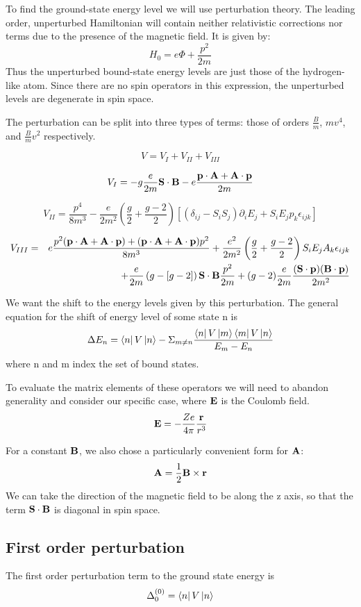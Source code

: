 To find the ground-state energy level we will use perturbation theory.  The leading order, unperturbed Hamiltonian will contain neither relativistic corrections nor terms due to the presence of the magnetic field.  It is given by:
\[ H_0 = e\Phi + \frac{p^2}{2m}  \]
Thus the unperturbed bound-state energy levels are just those of the hydrogen-like atom.  Since there are no spin operators in this expression, the unperturbed levels are degenerate in spin space.

The perturbation can be split into three types of terms: those of orders $\frac{B}{m}$, $mv^4$, and $\frac{B}{m}v^2$ respectively.

\[	V = V_{I} + V_{II} + V_{III}	\]

\[V_{I} = -g \frac{e}{2m} \mathbf{S} \cdot \mathbf{B} - e \frac{\mathbf{p} \cdot \mathbf{A} + \mathbf{A} \cdot \mathbf{p}}{2m} \]

\[V_{II} = \frac{p^4}{8m^3} - \frac{e}{2m^2}\left(\frac{g}{2} + \frac{g-2}{2} \right) \left [ (\delta_{ij} - S_i S_j ) \partial_i E_j + S_i E_j p_k \epsilon_{ijk} \right ]  \] 

\begin{eqnarray*}
 V_{III} &=& 
		e\frac{p^2 ( \mathbf{p} \cdot \mathbf{A} + \mathbf{A} \cdot \mathbf{p}) + (\mathbf{p} \cdot \mathbf{A} + \mathbf{A} \cdot \mathbf{p})p^2}{8m^3}
		+  \frac{e^2}{2m^2} \left(\frac{g}{2} + \frac{g-2}{2} \right)  S_i  E_j A_k \epsilon_{ijk}	\\
	&&	+ \frac{e}{2m}\left( g - [g-2] \right) \mathbf{S} \cdot \mathbf{B} \frac{p^2}{2m} 
		+ (g-2)\frac{e}{2m} \frac{ (\mathbf{S} \cdot \mathbf{p}) (\mathbf{B} \cdot \mathbf{p})}{2m^2}
\end{eqnarray*}

We want the shift to the energy levels given by this perturbation.  The general equation for the shift of energy level of some state n is
\[
	\Delta E_n = \matrixel{n}{V}{n}	- \Sigma_{m \neq n} \frac {\matrixel{n}{V}{m} \matrixel{m}{V}{n}} { E_m - E_n }
\]
where n and m index the set of bound states.

To evaluate the matrix elements of these operators we will need to abandon generality and consider our specific case, where $\mathbf{E}$ is the Coulomb field. 
\[	\mathbf{E} = -\frac{Ze}{4\pi} \frac{\mathbf{r}}{r^3}	\]

For a constant $\mathbf{B}$, we also chose a particularly convenient form for $\mathbf{A}$:
\[	\mathbf{A} = \frac{1}{2}\mathbf{B} \times \mathbf{r}		\]
We can take the direction of the magnetic field to be along the z axis, so that the term $\mathbf{S} \cdot \mathbf{B}$ is diagonal in spin space.

\subsection*{First order perturbation}
The first order perturbation term to the ground state energy is
\[	\Delta^{(0)}_0 = \matrixel{n}{V}{n}	\]


